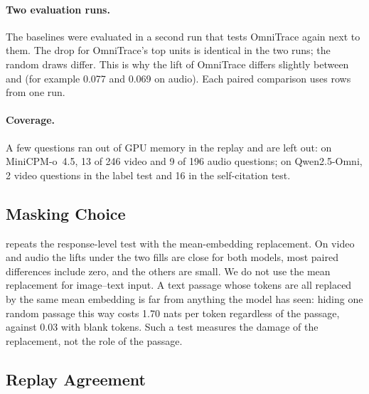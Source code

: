 \paragraph{Two evaluation runs.}
The baselines were evaluated in a second run that tests OmniTrace again next to them. The drop for OmniTrace's top units is identical in the two runs; the random draws differ. This is why the lift of OmniTrace differs slightly between  and  (for example 0.077 and 0.069 on audio). Each paired comparison uses rows from one run.

\paragraph{Coverage.}
A few questions ran out of GPU memory in the replay and are left out: on MiniCPM-o~4.5, 13 of 246 video and 9 of 196 audio questions; on Qwen2.5-Omni, 2 video questions in the label test and 16 in the self-citation test.

\subsection{Masking Choice}
\label{appendix:masking}

\begin{table}[t]
\centering
\small

\caption{Lift of OmniTrace under two ways of hiding a unit, on the same questions: a content-free placeholder at the input (\emph{empty}, used throughout the paper) and replacing the unit's embeddings by their mean (\emph{mean}).}
\label{tab:masking}
\end{table}

 repeats the response-level test with the mean-embedding replacement.
On video and audio the lifts under the two fills are close for both models, most paired differences include zero, and the others are small.
We do not use the mean replacement for image--text input. A text passage whose tokens are all replaced by the same mean embedding is far from anything the model has seen: hiding one random passage this way costs 1.70 nats per token regardless of the passage, against 0.03 with blank tokens. Such a test measures the damage of the replacement, not the role of the passage.

\subsection{Replay Agreement}
\label{appendix:replay}

